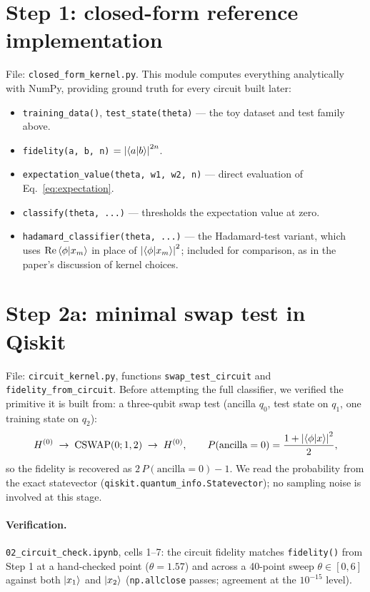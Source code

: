 \documentclass[11pt,a4paper]{article}
\begin{document}
\section{Step 1: closed-form reference implementation}

File: \texttt{closed\_form\_kernel.py}. This module computes everything
analytically with NumPy, providing ground truth for every circuit built
later:

\begin{itemize}
  \item \texttt{training\_data()}, \texttt{test\_state(theta)} --- the toy
        dataset and test family above.
  \item \texttt{fidelity(a, b, n)} $= \abs{\braket{a}{b}}^{2n}$.
  \item \texttt{expectation\_value(theta, w1, w2, n)} --- direct evaluation
        of Eq.~\eqref{eq:expectation}.
  \item \texttt{classify(theta, ...)} --- thresholds the expectation value
        at zero.
  \item \texttt{hadamard\_classifier(theta, ...)} --- the Hadamard-test
        variant, which uses $\Re\braket{\phi}{x_m}$ in place of
        $\abs{\braket{\phi}{x_m}}^2$; included for comparison, as in the
        paper's discussion of kernel choices.
\end{itemize}

\section{Step 2a: minimal swap test in Qiskit}

File: \texttt{circuit\_kernel.py}, functions \texttt{swap\_test\_circuit}
and \texttt{fidelity\_from\_circuit}. Before attempting the full
classifier, we verified the primitive it is built from: a three-qubit swap
test (ancilla $q_0$, test state on $q_1$, one training state on $q_2$):
\begin{equation}
  H^{(0)} \;\rightarrow\; \text{CSWAP}(0;1,2) \;\rightarrow\; H^{(0)},
  \qquad
  P(\text{ancilla} = 0) = \frac{1 + \abs{\braket{\phi}{x}}^2}{2},
\end{equation}
so the fidelity is recovered as $2\,P(\text{ancilla}=0) - 1$. We read the
probability from the exact statevector
(\texttt{qiskit.quantum\_info.Statevector}); no sampling noise is involved
at this stage.

\paragraph{Verification.} \texttt{02\_circuit\_check.ipynb}, cells 1--7:
the circuit fidelity matches \texttt{fidelity()} from Step 1 at a
hand-checked point ($\theta = 1.57$) and across a 40-point sweep
$\theta \in [0, 6]$ against both $\ket{x_1}$ and $\ket{x_2}$
(\texttt{np.allclose} passes; agreement at the $10^{-15}$ level).
\end{document}
